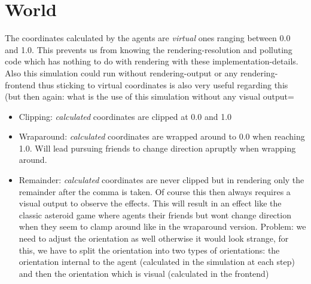 \section{World}
The coordinates calculated by the agents are \textit{virtual} ones ranging between 0.0 and 1.0. This prevents us from knowing the rendering-resolution and polluting code which has nothing to do with rendering with these implementation-details. Also this simulation could run without rendering-output or any rendering-frontend thus sticking to virtual coordinates is also very useful regarding this (but then again: what is the use of this simulation without any visual output=

\begin{itemize}
\item Clipping: \textit{calculated} coordinates are clipped at 0.0 and 1.0 
\item Wraparound: \textit{calculated} coordinates are wrapped around to 0.0 when reaching 1.0. Will lead pursuing friends to change direction apruptly when wrapping around.
\item Remainder: \textit{calculated} coordinates are never clipped but in rendering only the remainder after the comma is taken. Of course this then always requires a visual output to observe the effects. This will result in an effect like the classic asteroid game where agents their friends but wont change direction when they seem to clamp around like in the wraparound version. Problem: we need to adjust the orientation as well otherwise it would look strange, for this, we have to split the orientation into two types of orientations: the orientation internal to the agent (calculated in the simulation at each step) and then the orientation which is visual (calculated in the frontend)
\end{itemize}